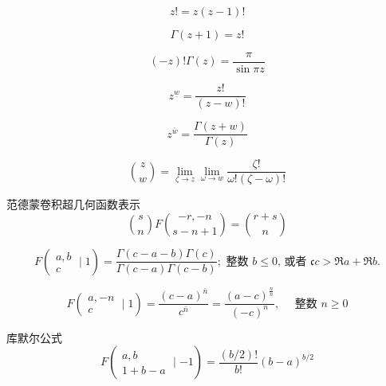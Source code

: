 \begin{equation}
    z! = z(z-1)!
\end{equation}

\begin{equation}
    \Gamma(z+1) = z!
\end{equation}

\begin{equation}
    (-z)!\Gamma(z) = \frac{\pi}{\sin{\pi z}}
\end{equation}

\begin{equation}
    z^{\underline{w}} = \frac{z!}{(z-w)!}
\end{equation}

\begin{equation}
    z^{\bar{w}} = \frac{\Gamma(z+w)}{\Gamma(z)}
\end{equation}

\begin{equation}
    {z \choose w}=\lim _{\zeta \rightarrow z} \lim _{\omega \rightarrow w} \frac{\zeta !}{\omega !(\zeta-\omega) !}
\end{equation}

范德蒙卷积超几何函数表示
\begin{equation}
    {s \choose n} F{-r,-n \choose s-n+1}={r+s \choose n}
\end{equation}
 
\begin{equation}
    F\left(\begin{array}{c}
    a, b \\
    c
    \end{array} \mid 1\right)=\frac{\Gamma(c-a-b) \Gamma(c)}{\Gamma(c-a) \Gamma(c-b)} ; \text { 整数 } b \leqslant 0 \text {, 或者 } \mathfrak{c} c>\Re a+\Re b .
\end{equation}

\begin{equation}
    F\left(\begin{array}{c}
    a,-n \\
    c
    \end{array} \mid 1\right)=\frac{(c-a)^{\bar{n}}}{c^{\bar{n}}}=\frac{(a-c)^{\frac{n}{n}}}{(-c)^{n}}, \quad \text { 整数 } n \geqslant 0
\end{equation}

库默尔公式
\begin{equation}
    F\left(\begin{array}{c}
    a, b \\
    1+b-a
    \end{array} \mid-1\right)=\frac{(b / 2) !}{b !}(b-a)^{b / 2}
\end{equation}

